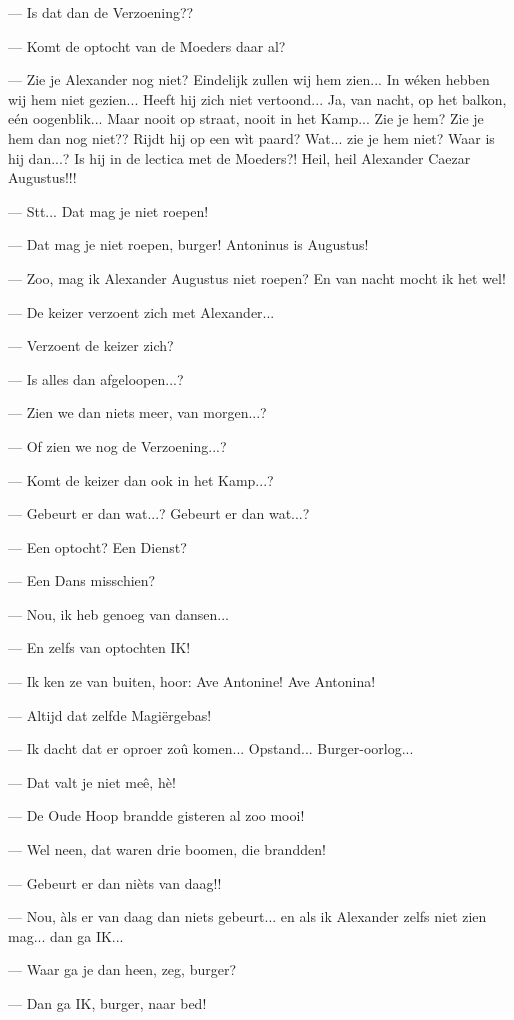 \documentclass[a4paper, 12pt, oneside, dutch]{article}
\begin{document}
--- Is dat dan de Verzoening??

--- Komt de optocht van de Moeders daar al?

--- Zie je Alexander nog niet? Eindelijk zullen wij hem zien... In wéken hebben wij hem niet gezien... Heeft hij zich niet vertoond... Ja, van nacht, op het balkon, eén oogenblik... Maar nooit op straat, nooit in het Kamp... Zie je hem? Zie je hem dan nog niet?? Rijdt hij op een wìt paard? Wat... zie je hem niet? Waar is hij dan...? Is hij in de lectica met de Moeders?! Heil, heil Alexander Caezar Augustus!!!

--- Stt... Dat mag je niet roepen!

--- Dat mag je niet roepen, burger! Antoninus is Augustus!

--- Zoo, mag ik Alexander Augustus niet roepen? En van nacht mocht ik het wel!

--- De keizer verzoent zich met Alexander...

--- Verzoent de keizer zich?

--- Is alles dan afgeloopen...?

--- Zien we dan niets meer, van morgen...?

--- Of zien we nog de Verzoening...?

--- Komt de keizer dan ook in het Kamp...?

--- Gebeurt er dan wat...? Gebeurt er dan wat...?

--- Een optocht? Een Dienst?

--- Een Dans misschien?

--- Nou, ik heb genoeg van dansen...

--- En zelfs van optochten IK!

--- Ik ken ze van buiten, hoor: Ave Antonine! Ave Antonina!

--- Altijd dat zelfde Magiërgebas!

--- Ik dacht dat er oproer zoû komen... Opstand... Burger-oorlog...

--- Dat valt je niet meê, hè!

--- De Oude Hoop brandde gisteren al zoo mooi!

--- Wel neen, dat waren drie boomen, die brandden!

--- Gebeurt er dan nièts van daag!!

--- Nou, àls er van daag dan niets gebeurt... en als ik Alexander zelfs niet zien mag... dan ga IK...

--- Waar ga je dan heen, zeg, burger?

--- Dan ga IK, burger, naar bed!
\end{document}

